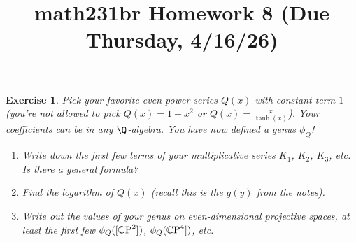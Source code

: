 \documentclass[11pt]{amsart}
\title{math231br Homework 8 (Due Thursday, 4/16/26)}
\newtheorem{hwexercise}{Exercise}
\begin{document}
\maketitle

\begin{hwexercise}
Pick your favorite even power series $Q(x)$ with constant term $1$ (you're not allowed to pick $Q(x) = 1 + x^2$ or $Q(x) = \frac{x}{\tanh(x)}$). Your coefficients can be in any $\Q$-algebra. You have now defined a genus $\phi_Q$!
\begin{enumerate}
    \item Write down the first few terms of your multiplicative series $K_1$, $K_2$, $K_3$, etc. Is there a general formula?
    \item Find the logarithm of $Q(x)$ (recall this is the $g(y)$ from the notes).
    \item Write out the values of your genus on even-dimensional projective spaces, at least the first few $\phi_Q([{\mathbb{C}\text{P}}^2])$, $\phi_Q({\mathbb{C}\text{P}}^4])$, etc.
\end{enumerate}
\end{hwexercise}
\end{document}
